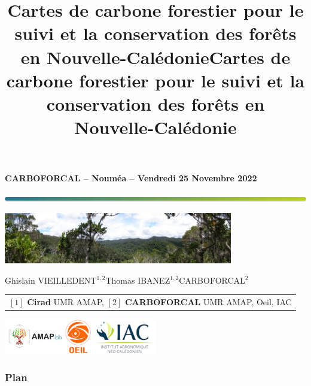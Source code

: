 \documentclass[10pt,table,dvipsnames,compress]{beamer}
\date{}
\title{Cartes de carbone forestier pour le suivi et la conservation des forêts en Nouvelle-Calédonie}
\title[CARBOFORCAL]{Cartes de carbone forestier pour le suivi et la conservation des forêts en Nouvelle-Calédonie}
\newif\ifplacelogo %
\begin{document}
{
  \begin{frame}
  \begin{center}
  \small{\textbf{CARBOFORCAL -- Nouméa -- Vendredi 25 Novembre 2022}}
  \end{center}
  \vspace{-0.5cm}
  \titlepage %
  \vspace{-3cm}
  \begin{center}
    \includegraphics[width=\textwidth]{figs/Barre_couleur}
    
    \vspace{0.25cm}
    
    \includegraphics[width=10cm]{figs/Banniere}
    
    \small{Ghislain VIEILLEDENT$^{1, 2}$\hspace{0.25cm}Thomas IBANEZ$^{1, 2}$\hspace{0.25cm}CARBOFORCAL$^{2}$}
      
    \vspace{0.25cm}
    
    {\scriptsize
      \begin{tabular}{l}
        $[1]$ \textbf{Cirad} UMR AMAP, $[2]$ \textbf{CARBOFORCAL} UMR AMAP, Oeil, IAC
      \end{tabular}
    }

    \vspace{0.25cm}
    
    \includegraphics[width=0.5\textwidth]{figs/partners_logos}
    
  \end{center}
  \end{frame}
}


\placelogotrue
\begin{frame}
  \frametitle{Plan}
  \begin{columns}[c]
    \begin{column}{0.5\textwidth}
      \tableofcontents[sections=1]
      \vspace{0.5cm}
      \tableofcontents[sections=2]
    \end{column}
    \begin{column}{0.5\textwidth}
        \tableofcontents[sections=3]
        \vspace{0.5cm}
        \tableofcontents[sections=4]
    \end{column}
  \end{columns}
\end{frame}
\placelogofalse
\end{document}
